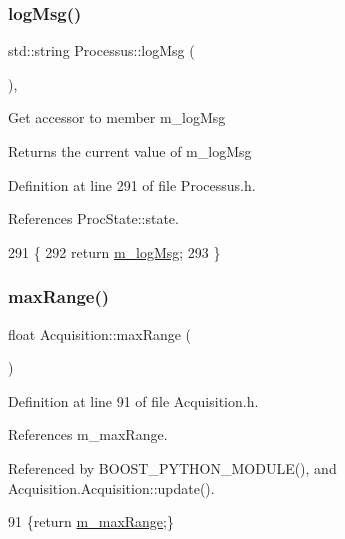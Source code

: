\subsubsection{\texorpdfstring{log\+Msg()}{logMsg()}}
{\footnotesize\ttfamily std\+::string Processus\+::log\+Msg (\begin{DoxyParamCaption}{ }\end{DoxyParamCaption})\hspace{0.3cm}{\ttfamily [inline]}, {\ttfamily [inherited]}}

Get accessor to member m\+\_\+log\+Msg \begin{DoxyReturn}{Returns}
the current value of m\+\_\+log\+Msg 
\end{DoxyReturn}


Definition at line 291 of file Processus.\+h.



References Proc\+State\+::state.


\begin{DoxyCode}
291                       \{
292     \textcolor{keywordflow}{return} \hyperlink{classProcessus_a3bc0140a3a69a83951ab7f9986bd2c84}{m\_logMsg};
293   \}
\end{DoxyCode}
\mbox{\label{classAcquisition_a386f3ebc6b1d4956aa7e40b314ddb4eb}} 
\subsubsection{\texorpdfstring{max\+Range()}{maxRange()}}
{\footnotesize\ttfamily float Acquisition\+::max\+Range (\begin{DoxyParamCaption}{ }\end{DoxyParamCaption})\hspace{0.3cm}{\ttfamily [inline]}}



Definition at line 91 of file Acquisition.\+h.



References m\+\_\+max\+Range.



Referenced by B\+O\+O\+S\+T\+\_\+\+P\+Y\+T\+H\+O\+N\+\_\+\+M\+O\+D\+U\+L\+E(), and Acquisition.\+Acquisition\+::update().


\begin{DoxyCode}
91 \{\textcolor{keywordflow}{return} \hyperlink{classAcquisition_a45478629e9db582470b4b158edb46616}{m\_maxRange};\}
\end{DoxyCode}
\mbox{\label{classAcquisition_a44f441710231748d2ca8f691647b2bcd}} 
